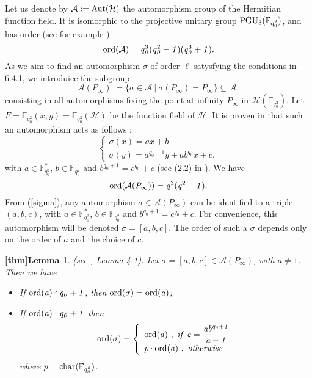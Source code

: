 \documentclass[10pt]{article}
\newtheorem{lem1}{[thm]Lemma}
\newcommand{\s}{\vspace{0.3cm}}
\newcommand{\cd}{\cdot}
\newcommand{\calA}{\mathcal{A}}
\newcommand{\calH}{\mathcal{H}}
\newcommand{\su}{\subseteq}
\begin{document}
Let us denote by $\calA := \rm Aut(\calH)$ the automorphism group of the Hermitian function field. It is isomorphic to the projective unitary group $\rm PGU_3(\mathbb{F}_{q_0^2})$, and has order (see for example \cite{Sti})
\[\rm ord \it (\calA) =  q_0^{\rm 3}\it (q_0^{\rm 2}-1)(\it q_0^{\rm 3}+1).\]
As we aim to find an automorphism $\sigma$ of order $\ell$ satysfying the conditions in 6.4.1, we introduice the subgroup
\[\calA(P_{\infty}) := \{ \sigma \in \calA \ | \ \sigma(P_{\infty}) = P_{\infty}\} \su \calA ,\]
consisting in all automorphisms fixing the point at infinity $P_{\infty}$ in $\calH(\mathbb{F}_{q_0^2})$. Let $F=\mathbb{F}_{q_0^2}(x,y)=\mathbb{F}_{q_0^2}(\calH)$ be the function field of $\calH$. It is proven in \cite{Gar} that such an automorphism acts as follows :
\begin{equation} \label{sigma}
\left\{ \begin{array}{ll}
\sigma(x) = ax+b \\
\sigma(y) = a^{q_0+1}y+ab^{q_0}x+c,
\end{array} \right.
\end{equation}
with $a \in \mathbb{F}_{q_0^2}^*$, $b \in \mathbb{F}_{q_0^2}$ and $b^{q_0+1} = c^{q_0}+c$ (see (2.2) in \cite{Gar}). We have 
\[\rm ord \it (\calA(P_{\infty})) = q^{\rm 3}\it (q^{\rm 2}-1).\]
From (\ref{sigma}), any automorphism $\sigma \in \calA(P_{\infty})$ can be identified to a triple $(a,b,c)$, with $a \in \mathbb{F}_{q_0^2}^*$, $b \in \mathbb{F}_{q_0^2}$ and $b^{q_0+1} = c^{q_0}+c$. For convenience, this automorphism will be denoted $\sigma = [a,b,c]$. The order of such a $\sigma$ depends only on the order of $a$ and the choice of $c$.

\s

\begin{lem1} \rm (see \cite{Gar}, Lemma 4.1). \it \label{ordsigma}
Let $\sigma = [a,b,c] \in \calA(P_{\infty})$, with $a \neq 1$. Then we have
\begin{itemize}
\item[(i)] If $\rm ord \it (a) \nmid q_0+1$, then $\rm ord \it (\sigma) = \rm ord \it (a)$;
\item[(ii)] If $\rm ord \it (a) \mid q_0+1$ then
\begin{equation*}
\rm ord \it (\sigma) = \left\{ \begin{array}{ll}
\rm ord \it (a) \ , \ if \ c=\dfrac{ab^{q_0+1}}{a-1} \\
p \cd \rm ord \it (a) \ , \  otherwise \ 
\end{array}
\right.
\end{equation*}
where $p=\rm char \it (\mathbb{F}_{q_0^2})$.
\end{itemize}
\end{lem1}
\end{document}
